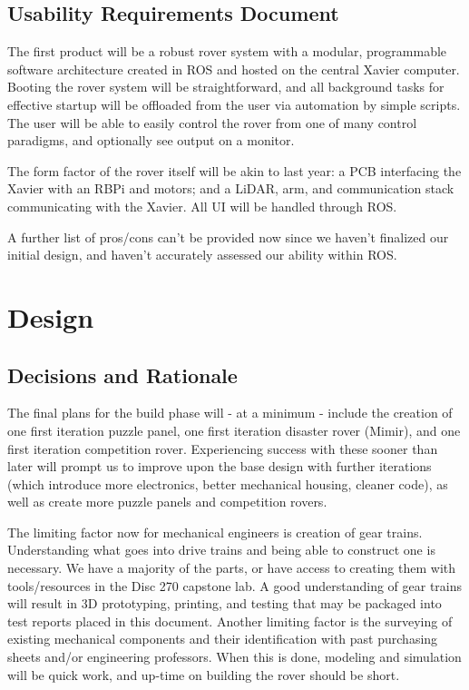 \documentclass[a4paper, 10pt]{article}
\begin{document}
	\subsection{Usability Requirements Document}
	The first product will be a robust rover system with a modular, programmable software architecture created in ROS and hosted on the central Xavier computer. Booting the rover system will be straightforward, and all background tasks for effective startup will be offloaded from the user via automation by simple scripts. The user will be able to easily control the rover from one of many control paradigms, and optionally see output on a monitor. 
	
The form factor of the rover itself will be akin to last year: a PCB interfacing the Xavier with an RBPi and motors; and a LiDAR, arm, and communication stack communicating with the Xavier. All UI will be handled through ROS. 

A further list of pros/cons can't be provided now since we haven't finalized our initial design, and haven't accurately assessed our ability within ROS.

\pagebreak
	
\section{Design}
	\subsection{Decisions and Rationale}
	The final plans for the build phase will - at a minimum - include the creation of one first iteration puzzle panel, one first iteration disaster rover (Mimir), and one first iteration competition rover. Experiencing success with these sooner than later will prompt us to improve upon the base design with further iterations (which introduce more electronics, better mechanical housing, cleaner code), as well as create more puzzle panels and competition rovers.
	
The limiting factor now for mechanical engineers is creation of gear trains. Understanding what goes into drive trains and being able to construct one is necessary. We have a majority of the parts, or have access to creating them with tools/resources in the Disc 270 capstone lab. A good understanding of gear trains will result in 3D prototyping, printing, and testing that may be packaged into test reports placed in this document. Another limiting factor is the surveying of existing mechanical components and their identification with past purchasing sheets and/or engineering professors. When this is done, modeling and simulation will be quick work, and up-time on building the rover should be short.
\end{document}
